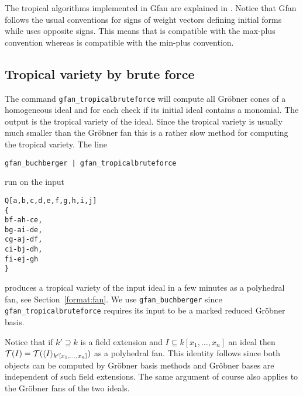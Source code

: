 The tropical algorithms
implemented in Gfan are explained in \cite{ctv}.
Notice that Gfan follows the usual conventions
for signs of weight vectors defining initial forms while \cite{ctv}
uses opposite signs. This means that \name is compatible with the max-plus convention whereas \cite{ctv} is compatible with the min-plus convention.

\subsection{Tropical variety by brute force}
The command \texttt{gfan\_tropicalbruteforce} will compute all
Gr\"obner cones of a homogeneous ideal and for each check if its initial ideal
contains a monomial. The output is the tropical variety of the
ideal. Since the tropical variety is usually much smaller than the
Gr\"obner fan this is a rather slow method for computing the tropical
variety. The line
\begin{verbatim}
gfan_buchberger | gfan_tropicalbruteforce
\end{verbatim}
run on the input
\begin{verbatim}
Q[a,b,c,d,e,f,g,h,i,j]
{
bf-ah-ce,
bg-ai-de,
cg-aj-df,
ci-bj-dh,
fi-ej-gh
}
\end{verbatim}
produces a tropical variety of the input ideal in a few minutes as a
polyhedral fan, see Section~\ref{format:fan}. We use
\texttt{gfan\_buchberger} since \texttt{gfan\_tropicalbruteforce}
requires its input to be a marked reduced Gr\"obner basis.
\begin{remark}
Notice that if $k'\supseteq k$ is a field extension and $I\subseteq
k[x_1,\dots,x_n]$ an ideal then $ \mathcal{T} (I)= \mathcal{T} (\langle
I\rangle_{k'[x_1,\dots,x_n]})$ as a polyhedral fan. This identity
follows since both objects can be computed by Gr\"obner basis methods
and Gr\"obner bases are independent of such field extensions. The same argument of course also applies to the Gr\"obner fans of the two ideals.
\end{remark}
